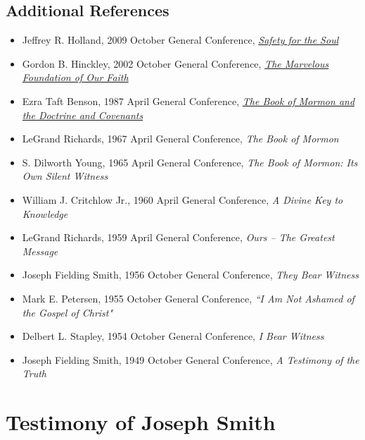 \documentclass[12pt]{report}
\begin{document}
\subsection{Additional References\label{8witness:references}}
\begin{itemize}
\item Jeffrey R. Holland, 2009 October General Conference, \href{https://www.lds.org/general-conference/2009/10/safety-for-the-soul?lang=eng}{\emph{Safety for the Soul}}
\item Gordon B. Hinckley, 2002 October General Conference, \href{https://www.lds.org/general-conference/2002/10/the-marvelous-foundation-of-our-faith?lang=eng}{\emph{The Marvelous Foundation of Our Faith}}
\item Ezra Taft Benson, 1987 April General Conference, \href{https://www.lds.org/general-conference/1987/04/the-book-of-mormon-and-the-doctrine-and-covenants?lang=eng}{\emph{The Book of Mormon and the Doctrine and Covenants}}
\item LeGrand Richards, 1967 April General Conference, \emph{The Book of Mormon}
\item S. Dilworth Young, 1965 April General Conference, \emph{The Book of Mormon: Its Own Silent Witness}
\item William J. Critchlow Jr., 1960 April General Conference, \emph{A Divine Key to Knowledge}
\item LeGrand Richards, 1959 April General Conference, \emph{Ours -- The Greatest Message}
\item Joseph Fielding Smith, 1956 October General Conference, \emph{They Bear Witness}
\item Mark E. Petersen, 1955 October General Conference, \emph{``I Am Not Ashamed of the Gospel of Christ"}
\item Delbert L. Stapley, 1954 October General Conference, \emph{I Bear Witness}
\item Joseph Fielding Smith, 1949 October General Conference, \emph{A Testimony of the Truth}
\end{itemize}

\section{Testimony of Joseph Smith\label{JStestimony}}
\end{document}
